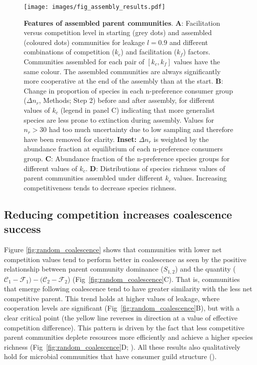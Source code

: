 \documentclass[10pt,letterpaper]{article}
\begin{document}
\begin{figure}[ht]
\begin{adjustwidth}{-1.5in}{0in}
	\centering
	\texttt{[image: images/fig\_assembly\_results.pdf]}
	\vspace{1pt}
	\caption{\textbf{Features of assembled parent communities}. \textbf{A}: Facilitation versus competition level in starting (grey dots) and assembled (coloured dots) communities for leakage $ l = 0.9 $ and different combinations of competition ($k_c$) and facilitation ($k_f$) factors. Communities assembled for each pair of $[k_c, k_f]$ values have the same colour. The assembled communities are always significantly more cooperative at the end of the assembly than at the start. \textbf{B}: Change in proportion of species in each n-preference consumer group ($\Delta n_r$, Methods; Step 2) before and after assembly, for different values of $k_c$ (legend in panel C) indicating that more generalist species are less prone to extinction during assembly. Values for $n_{r} > 30$ had too much uncertainty due to low sampling and therefore have been removed for clarity. \textbf{Inset:} $\Delta n_r$ is weighted by the abundance fraction  at equilibrium of each n-preference consumers group. \textbf{C}: Abundance fraction of the n-preference species groups for different values of $k_c$. \textbf{D}: Distributions of species richness values of parent communities assembled under different $k_c$ values. Increasing competitiveness tends to decrease species richness.}
	\label{fig:assembly}
\end{adjustwidth}
\end{figure}

\subsection*{Reducing competition increases coalescence success}

Figure \ref{fig:random_coalescence} shows that communities with lower net competition values tend to perform better in coalescence as seen by the positive relationship between parent community dominance ($S_{1,2}$) and the quantity ($\mathcal{C}_1 - \mathcal{F}_1) - (\mathcal{C}_2 - \mathcal{F}_2$)  (Fig~\ref{fig:random_coalescence}C). That is, communities that emerge following coalescence tend to have greater similarity with the less net competitive parent. This trend holds at higher values of leakage, where cooperation levels are significant (Fig~\ref{fig:random_coalescence}B), but with a clear critical point (the yellow line reverses in direction at a value of effective competition difference). This pattern is driven by the fact that less competitive parent communities deplete resources more efficiently and achieve a higher species richness (Fig~\ref{fig:random_coalescence}D; ). All these results also qualitatively hold for microbial communities that have consumer guild structure ().
\end{document}
